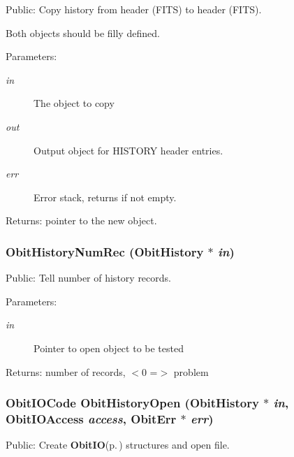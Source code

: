 Public: Copy history from header (FITS) to header (FITS). 

Both objects should be filly defined. \begin{Desc}
\item[Parameters:]
\begin{description}
\item[{\em in}]The object to copy \item[{\em out}]Output object for HISTORY header entries. \item[{\em err}]Error stack, returns if not empty. \end{description}
\end{Desc}
\begin{Desc}
\item[Returns:]pointer to the new object. \end{Desc}
\subsubsection{ Obit\-History\-Num\-Rec ({\bf Obit\-History} $\ast$ {\em in})}\label{ObitHistory_8h_a23}


Public: Tell number of history records. 

\begin{Desc}
\item[Parameters:]
\begin{description}
\item[{\em in}]Pointer to open object to be tested \end{description}
\end{Desc}
\begin{Desc}
\item[Returns:]number of records, $<$0 =$>$ problem \end{Desc}
\subsubsection{\setlength{\rightskip}{0pt plus 5cm}Obit\-IOCode Obit\-History\-Open ({\bf Obit\-History} $\ast$ {\em in}, Obit\-IOAccess {\em access}, {\bf Obit\-Err} $\ast$ {\em err})}\label{ObitHistory_8h_a17}


Public: Create {\bf Obit\-IO}{\rm (p.\,\pageref{structObitIO})} structures and open file. 

